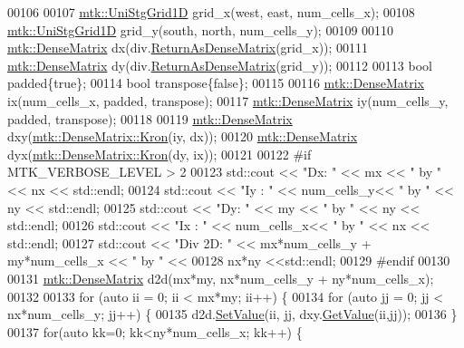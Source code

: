 \begin{DoxyCode}
00106 
00107   \hyperlink{classmtk_1_1UniStgGrid1D}{mtk::UniStgGrid1D} grid\_x(west, east, num\_cells\_x);
00108   \hyperlink{classmtk_1_1UniStgGrid1D}{mtk::UniStgGrid1D} grid\_y(south, north, num\_cells\_y);
00109 
00110   \hyperlink{classmtk_1_1DenseMatrix}{mtk::DenseMatrix} dx(div.\hyperlink{classmtk_1_1Div1D_a213fddbaaf86e4840c6a9649b69c2d49}{ReturnAsDenseMatrix}(grid\_x));
00111   \hyperlink{classmtk_1_1DenseMatrix}{mtk::DenseMatrix} dy(div.\hyperlink{classmtk_1_1Div1D_a213fddbaaf86e4840c6a9649b69c2d49}{ReturnAsDenseMatrix}(grid\_y));
00112 
00113   \textcolor{keywordtype}{bool} padded\{\textcolor{keyword}{true}\};
00114   \textcolor{keywordtype}{bool} transpose\{\textcolor{keyword}{false}\};
00115 
00116   \hyperlink{classmtk_1_1DenseMatrix}{mtk::DenseMatrix} ix(num\_cells\_x, padded, transpose);
00117   \hyperlink{classmtk_1_1DenseMatrix}{mtk::DenseMatrix} iy(num\_cells\_y, padded, transpose);
00118 
00119   \hyperlink{classmtk_1_1DenseMatrix}{mtk::DenseMatrix} dxy(\hyperlink{classmtk_1_1DenseMatrix_a01d3d8bd502870f93bf3a88a0cc5fb49}{mtk::DenseMatrix::Kron}(iy, dx));
00120   \hyperlink{classmtk_1_1DenseMatrix}{mtk::DenseMatrix} dyx(\hyperlink{classmtk_1_1DenseMatrix_a01d3d8bd502870f93bf3a88a0cc5fb49}{mtk::DenseMatrix::Kron}(dy, ix));
00121 
00122 \textcolor{preprocessor}{  #if MTK\_VERBOSE\_LEVEL > 2}
00123   std::cout << \textcolor{stringliteral}{"Dx: "} << mx << \textcolor{stringliteral}{" by "} << nx << std::endl;
00124   std::cout << \textcolor{stringliteral}{"Iy : "} << num\_cells\_y<< \textcolor{stringliteral}{" by "} << ny  << std::endl;
00125   std::cout << \textcolor{stringliteral}{"Dy: "} << my << \textcolor{stringliteral}{" by "} << ny << std::endl;
00126   std::cout << \textcolor{stringliteral}{"Ix : "} << num\_cells\_x<< \textcolor{stringliteral}{" by "} << nx  << std::endl;
00127   std::cout << \textcolor{stringliteral}{"Div 2D: "} << mx*num\_cells\_y + my*num\_cells\_x << \textcolor{stringliteral}{" by "} <<
00128     nx*ny <<std::endl;
00129 \textcolor{preprocessor}{  #endif}
00130 
00131   \hyperlink{classmtk_1_1DenseMatrix}{mtk::DenseMatrix} d2d(mx*my, nx*num\_cells\_y + ny*num\_cells\_x);
00132 
00133   \textcolor{keywordflow}{for} (\textcolor{keyword}{auto} ii = 0; ii < mx*my; ii++) \{
00134     \textcolor{keywordflow}{for} (\textcolor{keyword}{auto} jj = 0; jj < nx*num\_cells\_y; jj++) \{
00135       d2d.\hyperlink{classmtk_1_1DenseMatrix_a784ce5784109ac86bfb9d8562b334b13}{SetValue}(ii, jj, dxy.\hyperlink{classmtk_1_1DenseMatrix_a4b23ecbebd970b5eea915dbb50691024}{GetValue}(ii,jj));
00136     \}
00137     \textcolor{keywordflow}{for}(\textcolor{keyword}{auto} kk=0; kk<ny*num\_cells\_x; kk++) \{

\end{DoxyCode}
